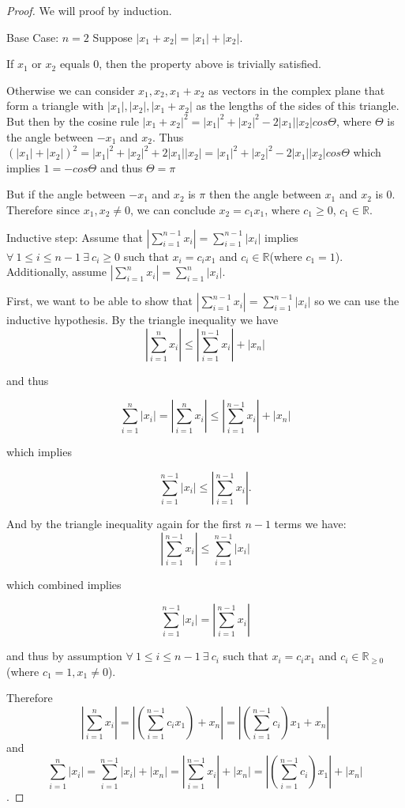\documentclass{amsart}
\theoremstyle{definition}
\theoremstyle{remark}
\numberwithin{equation}{section}
\begin{document}
\begin{proof}
We will proof by induction.

Base Case: $n = 2$
Suppose $|x_1 + x_2| = |x_1| + |x_2|$.

If $x_1$ or $x_2$ equals $0$, then the property above is trivially satisfied.


Otherwise we can consider $x_1, x_2, x_1 + x_2$ as vectors in the complex plane that form a triangle with $|x_1|, |x_2|, |x_1 + x_2| $ as the lengths of the sides of this triangle.
But then by the cosine rule $|x_1 + x_2|^2 = |x_1|^2 + |x_2|^2 - 2|x_1||x_2|cos\Theta$, where $\Theta$ is the angle between $-x_1$ and $x_2$.
Thus $(|x_1| + |x_2|)^2 = |x_1|^2 + |x_2|^2 + 2|x_1||x_2| = |x_1|^2 + |x_2|^2 - 2|x_1||x_2|cos\Theta$
which implies $1 = -cos\Theta$ and thus $\Theta = \pi$

But if the angle between $-x_1$ and $x_2$ is $\pi$  then the angle between $x_1$ and $x_2$ is $0$.
Therefore since $x_1, x_2 \neq 0$, we can conclude $x_2 = c_1x_1$, where $c_1 \geq 0$, $c_1 \in \mathbb{R}$.


Inductive step:
Assume that $|\sum_{i = 1}^{n-1} x_i| = \sum_{i = 1}^{n-1}| x_i|$ implies $\forall\ 1 \leq i \leq n-1\ \exists\ c_i \geq 0$ such that $x_i = c_ix_1$ and $c_i \in \mathbb{R}$(where $c_1 = 1$).  Additionally, assume $|\sum_{i = 1}^{n} x_i| = \sum_{i = 1}^{n}| x_i|$.

First, we want to be able to show that $|\sum_{i = 1}^{n-1} x_i| = \sum_{i = 1}^{n-1}| x_i|$ so we can use the inductive hypothesis.
By the triangle inequality we have
$$|\sum_{i = 1}^{n} x_i|  \leq |\sum_{i = 1}^{n-1} x_i| + | x_n|$$

and thus 

$$ \sum_{i = 1}^{n}| x_i| = |\sum_{i = 1}^{n} x_i|  \leq |\sum_{i = 1}^{n-1} x_i| + | x_n|$$

which implies 

$$ \sum_{i = 1}^{n-1}| x_i| \leq |\sum_{i = 1}^{n-1} x_i|.$$


And by the triangle inequality again for the first $n-1$ terms we have:
$$ |\sum_{i = 1}^{n-1} x_i| \leq \sum_{i = 1}^{n-1}| x_i|$$


which combined implies

$$\sum_{i = 1}^{n-1}| x_i| = |\sum_{i = 1}^{n-1} x_i|$$

and thus by assumption $\forall\ 1 \leq i \leq n-1\ \exists\ c_i$ such that $x_i = c_ix_1$ and $c_i \in \mathbb{R}_{\geq 0}$ (where $c_1 = 1, x_1 \neq 0$).

Therefore 
$$|\sum_{i = 1}^{n} x_i| = |(\sum_{i = 1}^{n-1} c_ix_1) + x_n| = |(\sum_{i = 1}^{n-1} c_i)x_1 + x_n|$$
and
$$\sum_{i = 1}^{n}| x_i| = \sum_{i = 1}^{n-1}| x_i| + |x_n| = |\sum_{i = 1}^{n-1} x_i| + |x_n| = |(\sum_{i = 1}^{n-1}c_i )x_1| + |x_n| $$.


\end{proof}
\end{document}
